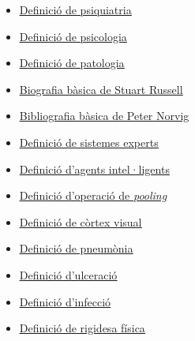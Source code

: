 \documentclass[a4paper,12pt]{report}
\begin{document}
\begin{itemize}
    \item \href{https://www.menteamente.com/psiquiatria-madrid#:~:text=%C2%BFQu%C3%A9%20es%20la%20psiquiatr%C3%ADa%3F,comportamiento%20y%20de%20las%20adicciones.}{\underline{Definició de psiquiatria}}
    \item \href{https://concepto.de/psicologia-3/}{\underline{Definició de psicologia}}
    \item \href{https://accessmedicina.mhmedical.com/content.aspx?bookid=1493&sectionid=102867681}{\underline{Definició de patologia}}
    \item \href{https://en.wikipedia.org/wiki/Stuart_J._Russell}{\underline{Biografia bàsica de Stuart Russell}}
    \item \href{https://en.wikipedia.org/wiki/Peter_Norvig}{\underline{Bibliografia bàsica de Peter Norvig}}
    \item \href{https://www.unir.net/ingenieria/revista/sistema-experto/#:~:text=Los%20sistemas%20expertos%20(SE)%20son,un%20profesional%20en%20la%20materia.}{\underline{Definició de sistemes experts}}
    \item \href{https://www.ceupe.com/blog/agente-inteligente.html}{\underline{Definició d'agents intel·ligents}}
    \item \href{https://keepcoding.io/blog/capas-pooling-red-neuronal-convolucional/#Capas_de_pooling_en_una_red_neuronal_convolucional}{\underline{Definició d'operació de \textit{pooling}}}
    \item \href{https://www.ncbi.nlm.nih.gov/books/NBK482504/#:~:text=The%20visual%20cortex%20is%20the,posterior%20region%20of%20the%20brain.}{\underline{Definició de còrtex visual}}
    \item \href{https://www.nhsinform.scot/illnesses-and-conditions/lungs-and-airways/pneumonia#:~:text=Pneumonia%20is%20swelling%20(inflammation)%20of,and%20fill%20up%20with%20fluid.}{\underline{Definició de pneumònia}}
    \item \href{https://www.cancer.gov/espanol/publicaciones/diccionarios/diccionario-cancer/def/ulceracion}{\underline{Definició d'ulceració}}
    \item \href{https://policlinicametropolitana.org/informacion-de-salud/infecciones-tipo-sintomas-prevencion/}{\underline{Definició d'infecció}}
    \item \href{https://www.fisioterapia-online.com/glosario/rigidez#:~:text=Definici%C3%B3n%20%2D%20Qu%C3%A9%20es%20rigidez&text=En%20el%20%C3%A1rea%20de%20la,dificultad%20para%20movilizar%20las%20articulaciones.}{\underline{Definició de rigidesa física}}

\end{itemize}
\end{document}
